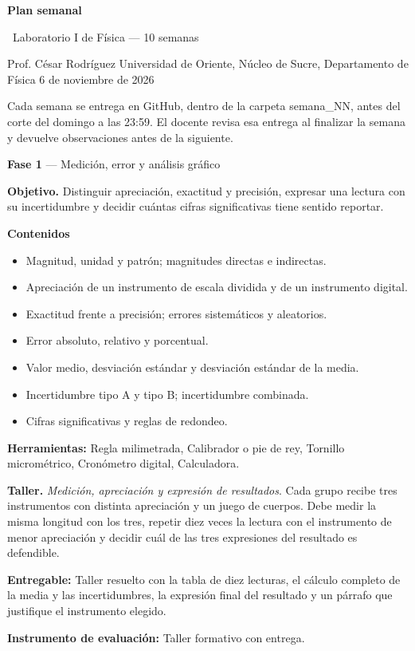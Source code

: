\documentclass[11pt,a4paper]{article}
\newcommand{\iconoBanda}{microchip}
\newcommand{\bandaTitulo}[3][fondoOscuro]{%
  \begin{tcolorbox}[
    enhanced,
    colback=#1, colframe=#1,
    boxrule=0pt, arc=8pt, outer arc=8pt,
    width=\linewidth,
    top=18pt, bottom=6pt, left=14pt, right=14pt,
    borderline south={3.5pt}{0pt}{cyanNeon},
  ]
    \begin{minipage}[c]{0.07\linewidth}
      \centering
      \textcolor{cyanNeon}{\fontsize{30}{30}\selectfont\faIcon{\iconoBanda}}
    \end{minipage}%
    \hspace{8pt}%
    \begin{minipage}[c]{0.88\linewidth}
      {\fontsize{20}{24}\selectfont\bfseries\color{white}#2}\par\vspace{5pt}%
      \textcolor{cyanNeon!80!white}{\small\faIcon{angle-right}~#3}%
    \end{minipage}
    \vspace{4pt}
  \end{tcolorbox}%
  \vspace{8pt}%
}
\renewcommand{\iconoBanda}{flask}
\begin{document}
\bandaTitulo[fondoOscuro]{Plan semanal}{Laboratorio I de Física --- 10 semanas}

\begin{center}\small\color{grisTexto}Prof. César Rodríguez \textbar{} Universidad de Oriente, Núcleo de Sucre, Departamento de Física \textbar{} 6 de noviembre de 2026\end{center}

Cada semana se entrega en GitHub, dentro de la carpeta semana\_NN, antes del corte del domingo a las 23:59. El docente revisa esa entrega al finalizar la semana y devuelve observaciones antes de la siguiente.

\begin{tcolorbox}[cajaContenido,title={Semana 1 --- La medición, la apreciación y el error}]
\textbf{Fase 1} --- Medición, error y análisis gráfico

\textbf{Objetivo.} Distinguir apreciación, exactitud y precisión, expresar una lectura con su incertidumbre y decidir cuántas cifras significativas tiene sentido reportar.

\textbf{Contenidos}

\begin{itemize}[leftmargin=1.4em,itemsep=2pt,topsep=3pt]
  \item Magnitud, unidad y patrón; magnitudes directas e indirectas.
  \item Apreciación de un instrumento de escala dividida y de un instrumento digital.
  \item Exactitud frente a precisión; errores sistemáticos y aleatorios.
  \item Error absoluto, relativo y porcentual.
  \item Valor medio, desviación estándar y desviación estándar de la media.
  \item Incertidumbre tipo A y tipo B; incertidumbre combinada.
  \item Cifras significativas y reglas de redondeo.
\end{itemize}

\textbf{Herramientas:} Regla milimetrada, Calibrador o pie de rey, Tornillo micrométrico, Cronómetro digital, Calculadora.

\textbf{Taller.} \emph{Medición, apreciación y expresión de resultados}. Cada grupo recibe tres instrumentos con distinta apreciación y un juego de cuerpos. Debe medir la misma longitud con los tres, repetir diez veces la lectura con el instrumento de menor apreciación y decidir cuál de las tres expresiones del resultado es defendible.

\textbf{Entregable:} Taller resuelto con la tabla de diez lecturas, el cálculo completo de la media y las incertidumbres, la expresión final del resultado y un párrafo que justifique el instrumento elegido.

\textbf{Instrumento de evaluación:} Taller formativo con entrega.
\end{tcolorbox}
\end{document}
